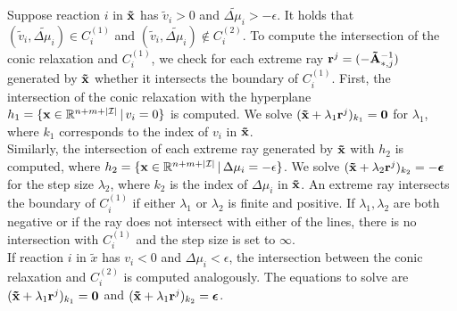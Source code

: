 Suppose reaction $i$ in $\bold{\tilde x}$ has $\tilde v_i >0$ and $\tilde{\Delta \mu_i} >- \epsilon$. It holds that $(\tilde v_i, \tilde{\Delta \mu_i}) \in C_i^{(1)}$ and $(\tilde v_i, \tilde{\Delta \mu_i}) \not \in C_i^{(2)}$. %
To compute the intersection of the conic relaxation and $C_i^{(1)}$, we check for each extreme ray $\bold r^j = (- \bold{\tilde A}^{-1}_{*,j})$ generated by $\bold{\tilde x}$ whether it intersects the boundary of $C_i^{(1)}$. 
First, the intersection of the conic relaxation with the hyperplane $h_1 = \{\bold x \in \mathbb{R}^{n + m + |\mathcal{I}|} \, | \, v_i = 0 \} $ is computed. We solve $(\bold{\tilde x} + \lambda_1 \bold r^j)_{k_1} = \bold 0$ for $\lambda_1$, where $k_1$ corresponds to the index of $v_i$ in $\bold{\tilde x}$. \\
Similarly, the intersection of each extreme ray generated by $\bold{\tilde x}$ with $h_2$ is computed, where $h_2 = \{\bold x \in \mathbb{R}^{n + m + |\mathcal{I}|} \, | \, \Delta \mu_i = -\epsilon \}$. We solve $(\bold{\tilde x} + \lambda_2 \bold r^j)_{k_2} = -\boldsymbol \epsilon$ for the step size $\lambda_2$, where $k_2$ is the index of $\Delta \mu_i$ in $\bold{\tilde x}$. 
An extreme ray intersects the boundary of $C_i^{(1)}$ if either $\lambda_1$ or $\lambda_2$ is finite and positive. If $\lambda_1, \lambda_2$ are both negative or if the ray does not intersect with either of the lines, there is no intersection with $C_i^{(1)}$ and the step size is set to $\infty$. \\
If reaction $i$ in $\tilde x$ has $v_i <0$ and $\Delta \mu_i < \epsilon$, the intersection between the conic relaxation and $C_i^{(2)}$ is computed analogously. The equations to solve are $(\bold{\tilde x} + \lambda_1 \bold r^j)_{k_1} = \bold 0$ and $(\bold{\tilde x} + \lambda_1 \bold r^j)_{k_2} = \boldsymbol \epsilon$.

